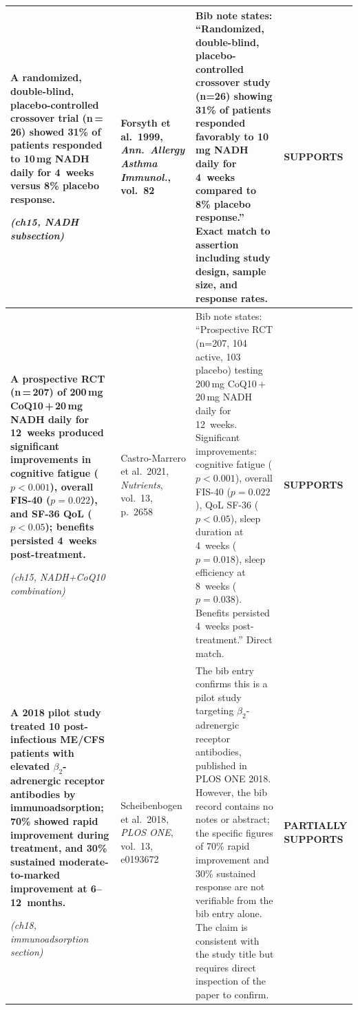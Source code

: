 \begin{longtable}{p{4.2cm}p{2.8cm}p{5.2cm}p{2.2cm}}
\raggedright
\textbf{A randomized, double-blind, placebo-controlled crossover trial
(n\,=\,26) showed 31\% of patients responded to 10\,mg NADH daily
for 4~weeks versus 8\% placebo response.}
\par\smallskip\textit{(ch15, NADH subsection)}
&
\cite{Forsyth1999NADH}\par\smallskip
Forsyth et al.\ 1999, \textit{Ann.\ Allergy Asthma Immunol.}, vol.~82
&
Bib note states: ``Randomized, double-blind, placebo-controlled
crossover study (n=26) showing 31\% of patients responded favorably
to 10\,mg NADH daily for 4~weeks compared to 8\% placebo response.''
Exact match to assertion including study design, sample size, and
response rates.
&
\textbf{SUPPORTS}\\
\midrule

\raggedright
\textbf{A prospective RCT (n\,=\,207) of 200\,mg CoQ10\,+\,20\,mg NADH
daily for 12~weeks produced significant improvements in cognitive
fatigue ($p<0.001$), overall FIS-40 ($p=0.022$), and SF-36 QoL
($p<0.05$); benefits persisted 4~weeks post-treatment.}
\par\smallskip\textit{(ch15, NADH+CoQ10 combination)}
&
\cite{CastroMarrero2021fatigue}\par\smallskip
Castro-Marrero et al.\ 2021, \textit{Nutrients}, vol.~13, p.~2658
&
Bib note states: ``Prospective RCT (n=207, 104 active, 103 placebo)
testing 200\,mg CoQ10\,+\,20\,mg NADH daily for 12~weeks.
Significant improvements: cognitive fatigue ($p<0.001$), overall
FIS-40 ($p=0.022$), QoL SF-36 ($p<0.05$), sleep duration at 4~weeks
($p=0.018$), sleep efficiency at 8~weeks ($p=0.038$).  Benefits
persisted 4~weeks post-treatment.''  Direct match.
&
\textbf{SUPPORTS}\\
\midrule

\raggedright
\textbf{A 2018 pilot study treated 10 post-infectious ME/CFS patients with
elevated $\beta_2$-adrenergic receptor antibodies by immunoadsorption;
70\% showed rapid improvement during treatment, and 30\% sustained
moderate-to-marked improvement at 6--12~months.}
\par\smallskip\textit{(ch18, immunoadsorption section)}
&
\cite{Scheibenbogen2018immunoadsorption}\par\smallskip
Scheibenbogen et al.\ 2018, \textit{PLOS ONE}, vol.~13, e0193672
&
The bib entry confirms this is a pilot study targeting
$\beta_2$-adrenergic receptor antibodies, published in PLOS ONE
2018.  However, the bib record contains no notes or abstract; the
specific figures of 70\% rapid improvement and 30\% sustained
response are not verifiable from the bib entry alone.  The claim is
consistent with the study title but requires direct inspection of
the paper to confirm.
&
\textbf{PARTIALLY SUPPORTS}\\
\midrule


\end{longtable}
